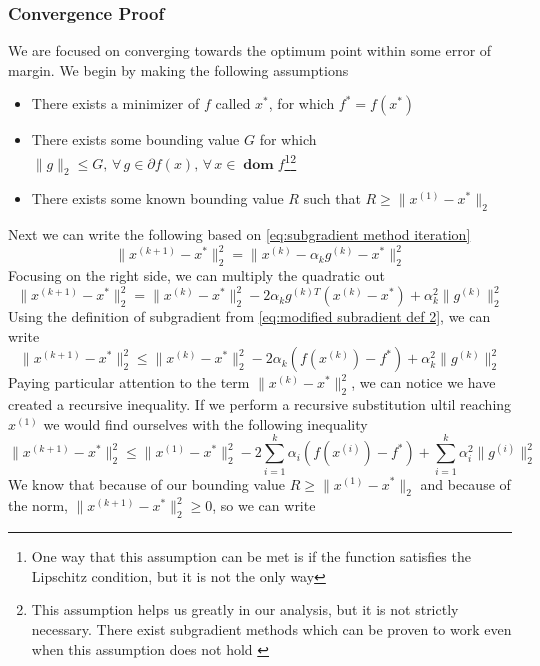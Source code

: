 \documentclass[journal,onecolumn]{IEEEtran}
\DeclareMathOperator{\dom}{\mathbf{dom}}
\let\oldforall\forall
\renewcommand{\forall}{ \, \oldforall \, }
\begin{document}
\subsubsection{Convergence Proof}
We are focused on converging towards the optimum point within some error of margin. We begin by making the following assumptions
\begin{itemize}
    \item There exists a minimizer of \(f\) called \(x^*\), for which \(f^* = f(x^*)\)
    \item There exists some bounding value \(G\) for which \(\|g\|_2 \leq G, \forall g \in \partial f(x), \forall x \in \dom f\)\footnote{One way that this assumption can be met is if the function satisfies the Lipschitz condition, but it is not the only way}\footnote{This assumption helps us greatly in our analysis, but it is not strictly necessary. There exist subgradient methods which can be proven to work even when this assumption does not hold \cite{boydparksubgradients}}
    \item There exists some known bounding value \(R\) such that \(R \geq \|x^{(1)}-x^*\|_2\)
\end{itemize}
Next we can write the following based on \eqref{eq:subgradient method iteration}
\begin{equation}
\|x^{(k+1)}-x^*\|^2_2 = \|x^{(k)} - \alpha_k g^{(k)}-x^*\|^2_2
\end{equation}
Focusing on the right side, we can multiply the quadratic out
\begin{equation}
\|x^{(k+1)}-x^*\|^2_2= \|x^{(k)}-x^*\|^2_2 - 2\alpha_k g^{(k)T}(x^{(k)}-x^*) + \alpha^2_k \|g^{(k)}\|^2_2
\end{equation}
Using the definition of subgradient from \eqref{eq:modified subradient def 2}, we can write
\begin{equation}
\|x^{(k+1)}-x^*\|^2_2 \leq \|x^{(k)}-x^*\|^2_2 - 2\alpha_k (f(x^{(k)})-f^*) + \alpha^2_k \|g^{(k)}\|^2_2
\end{equation}
Paying particular attention to the term \(\|x^{(k)}-x^*\|^2_2\), we can notice we have created a recursive inequality. If we perform a recursive substitution ultil reaching \(x^{(1)}\) we would find ourselves with the following inequality
\begin{equation}
\|x^{(k+1)}-x^*\|^2_2 \leq \|x^{(1)}-x^*\|^2_2 - 2\sum^k_{i=1}\alpha_i (f(x^{(i)})-f^*) + \sum^k_{i=1}\alpha^2_i\|g^{(i)}\|^2_2
\end{equation}
We know that because of our bounding value \(R \geq \|x^{(1)}-x^*\|_2\) and because of the norm, \(\|x^{(k+1)}-x^*\|^2_2 \geq 0\), so we can write
\end{document}
